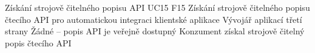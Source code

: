 
\begin{UseCaseTable}
  {Získání strojově čitelného popisu API}
  {UC15}
  {F15}
  {Získání strojově čitelného popisu čtecího API pro automatickou integraci klientské aplikace}
  {Vývojář aplikací třetí strany}
  {}
  {Žádné -- popis API je veřejně dostupný}
  {Konzument získal strojově čitelný popis čtecího API}


\end{UseCaseTable}
